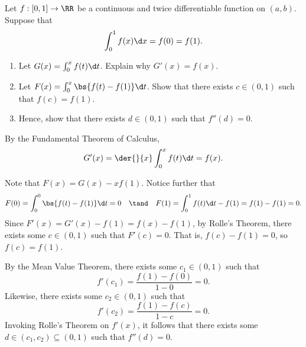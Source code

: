 \begin{problem}
    Let $f: [0, 1] \to \RR$ be a continuous and twice differentiable function on $(a, b)$. Suppose that \[\int_0^1 f(x) \d x = f(0) = f(1).\]
    
    \begin{enumerate}
        \item Let $G(x) = \int_0^x f(t) \d t$. Explain why $G'(x) = f(x)$.
        \item Let $F(x) = \int_0^x \bs{f(t) - f(1)} \d t$. Show that there exists $c \in (0, 1)$ such that $f(c) = f(1)$.
        \item Hence, show that there exists $d \in (0, 1)$ such that $f''(d) = 0$.
    \end{enumerate}
\end{problem}
\begin{solution}
    \begin{ppart}
        By the Fundamental Theorem of Calculus, \[G'(x) = \der{}{x} \int_0^x f(t) \d t = f(x).\]
    \end{ppart}
    \begin{ppart}
        Note that $F(x) = G(x) - x f(1)$. Notice further that \[F(0) = \int_0^0 \bs{f(t) - f(1)} \d t = 0 \quad \tand \quad F(1) = \int_0^1 f(t) \d t - f(1) = f(1) - f(1) = 0.\] Since $F'(x) = G'(x) - f(1) = f(x) - f(1)$, by Rolle's Theorem, there exists some $c \in (0, 1)$ such that $F'(c) = 0$. That is, $f(c) - f(1) = 0$, so $f(c) = f(1)$.
    \end{ppart}
    \begin{ppart}
        By the Mean Value Theorem, there exists some $c_1 \in (0, 1)$ such that \[f'(c_1) = \frac{f(1) - f(0)}{1 - 0} = 0.\] Likewise, there exists some $c_2 \in (0, 1)$ such that \[f'(c_2) = \frac{f(1) - f(c)}{1 - c} = 0.\] Invoking Rolle's Theorem on $f'(x)$, it follows that there exists some $d \in (c_1, c_2) \subseteq (0, 1)$ such that $f''(d) = 0$.
    \end{ppart}
\end{solution}


